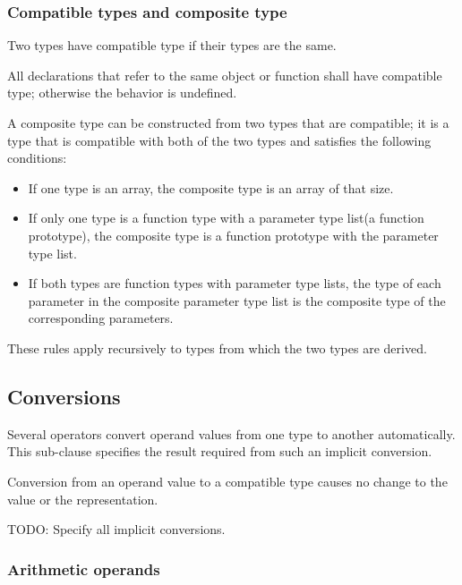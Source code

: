 \documentclass{article}
\begin{document}
\subsubsection{Compatible types and composite type}
Two types have compatible type if their types are the same.
\linebreak

All declarations that refer to the same object or function shall have compatible type; 
otherwise the behavior is undefined.
\linebreak

A composite type can be constructed from two types that are compatible; it is a type that 
is compatible with both of the two types and satisfies the following conditions:
\begin{itemize}
	\item If one type is an array, the composite type is an array of that size.
	\item If only one type is a function type with a parameter type list(a function 
	      prototype), the composite type is a function prototype with the parameter type 
	      list.
	\item If both types are function types with parameter type lists, the type of each 
	      parameter in the composite parameter type list is the composite type of the 
	      corresponding parameters.
\end{itemize}
These rules apply recursively to types from which the two types are derived.
\linebreak

\subsection{Conversions}
Several operators convert operand values from one type to another automatically. This 
sub-clause specifies the result required from such an implicit conversion.
\linebreak

Conversion from an operand value to a compatible type causes no change to the value or
the representation.
\linebreak

TODO: Specify all implicit conversions.

\subsubsection{Arithmetic operands}
\end{document}
